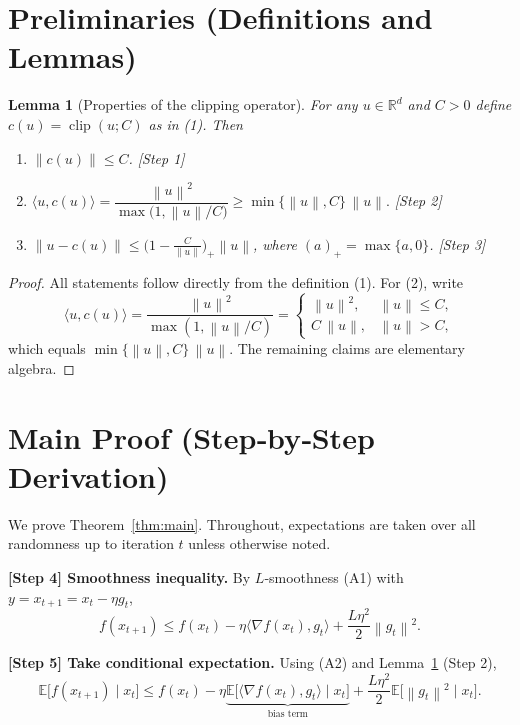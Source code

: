 \documentclass{article}
\newtheorem{lemma}{Lemma}
\newcommand{\E}{\mathbb{E}}
\newcommand{\R}{\mathbb{R}}
\newcommand{\norm}[1]{\left\lVert #1\right\rVert}
\begin{document}
\section*{Preliminaries (Definitions and Lemmas)}
\begin{lemma}[Properties of the clipping operator]\label{lem:clipprop}
For any $u\in\R^{d}$ and $C>0$ define $c(u)=\operatorname{clip}(u;C)$ as in (1). Then
\begin{enumerate}
\item $\norm{c(u)}\le C$. \hfill[Step 1]
\item $\langle u, c(u)\rangle = \dfrac{\norm{u}^{2}}{\max\bigl(1,\norm{u}/C\bigr)}
      \ge \min\{\norm{u},C\}\,\norm{u}.$ \hfill[Step 2]
\item $ \norm{u-c(u)}\le \bigl(1-\tfrac{C}{\norm{u}}\bigr)_{+}\norm{u}$,
      where $(a)_{+}=\max\{a,0\}$. \hfill[Step 3]
\end{enumerate}
\end{lemma}
\begin{proof}
All statements follow directly from the definition (1). For (2), write
\[
\langle u,c(u)\rangle
 =\frac{\norm{u}^{2}}{\max(1,\norm{u}/C)}
 =\begin{cases}
   \norm{u}^{2}, & \norm{u}\le C,\\[2mm]
   C\,\norm{u}, & \norm{u}>C,
  \end{cases}
\]
which equals $\min\{\norm{u},C\}\,\norm{u}$. The remaining claims are elementary algebra. \qedhere
\end{proof}

\section*{Main Proof (Step‑by‑Step Derivation)}
We prove Theorem~\ref{thm:main}. Throughout, expectations are taken over all randomness up to iteration $t$ unless otherwise noted.

\bigskip
\noindent\textbf{[Step 4] Smoothness inequality.} By $L$‑smoothness (A1) with $y=x_{t+1}=x_t-\eta g_t$,
\[
f(x_{t+1})\le f(x_t)-\eta\langle\nabla f(x_t),g_t\rangle
               +\frac{L\eta^{2}}{2}\norm{g_t}^{2}.
\tag{5}
\]

\noindent\textbf{[Step 5] Take conditional expectation.} Using (A2) and Lemma~\ref{lem:clipprop} (Step 2),
\[
\E\!\bigl[f(x_{t+1})\mid x_t\bigr]
\le f(x_t)-\eta\underbrace{\E\!\bigl[\langle\nabla f(x_t),g_t\rangle\mid x_t\bigr]}_{\text{bias term}}
     +\frac{L\eta^{2}}{2}\E\!\bigl[\norm{g_t}^{2}\mid x_t\bigr].
\tag{6}
\]
\end{document}
